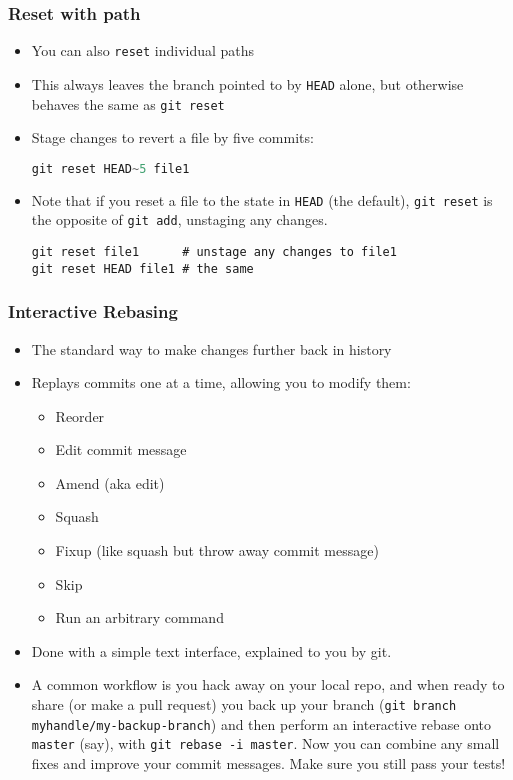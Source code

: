 \documentclass{beamer}
\begin{document}
\begin{frame}[fragile]
\frametitle{Reset with path}
\begin{itemize}
\item You can also \lstinline{reset} individual paths
\item This always leaves the branch pointed to by \texttt{HEAD} alone, but otherwise behaves the same as \lstinline{git reset}
\item Stage changes to revert a file by five commits:
\begin{lstlisting}[language=C++]
git reset HEAD~5 file1
\end{lstlisting}
\item Note that if you reset a file to the state in \texttt{HEAD} (the default), \lstinline{git reset} is the opposite of \lstinline{git add}, unstaging any changes.
\begin{lstlisting}
git reset file1      # unstage any changes to file1
git reset HEAD file1 # the same
\end{lstlisting}
\end{itemize}
\end{frame}

\begin{frame}[fragile]
\frametitle{Interactive Rebasing}
\begin{itemize}
\item The standard way to make changes further back in history
\item Replays commits one at a time, allowing you to modify them:
\begin{itemize}
\item Reorder
\item Edit commit message
\item Amend (aka edit)
\item Squash
\item Fixup (like squash but throw away commit message)
\item Skip
\item Run an arbitrary command
\end{itemize}
\item Done with a simple text interface, explained to you by git.
\item A common workflow is you hack away on your local repo, and when ready to share (or make a pull request) you back up your branch (\lstinline{git branch myhandle/my-backup-branch}) and then perform an interactive rebase onto \lstinline{master} (say), with \lstinline{git rebase -i master}. Now you can combine any small fixes and improve your commit messages. Make sure you still pass your tests!
\end{itemize}
\end{frame}
\end{document}
